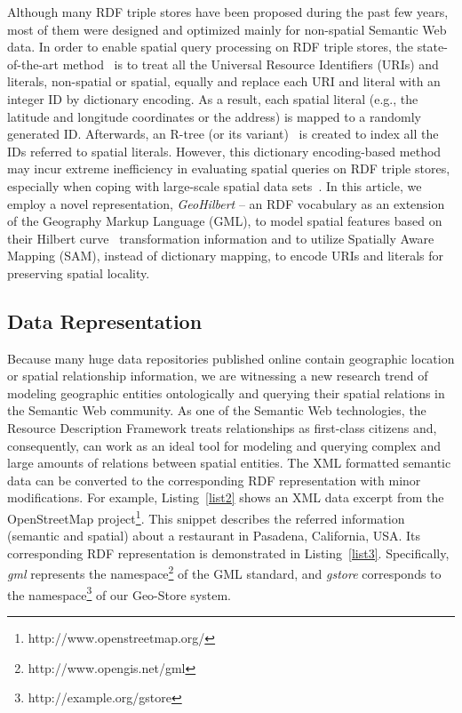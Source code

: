 
Although many RDF triple stores have been proposed during the past
few years, most of them were designed and optimized mainly for
non-spatial Semantic Web data. In order to enable spatial query
processing on RDF triple stores, the state-of-the-art
method~\cite{conf/gis/BrodtNM10} is to treat all the Universal
Resource Identifiers (URIs) and literals, non-spatial or spatial,
equally and replace each URI and literal with an integer ID by
dictionary encoding. As a result, each spatial literal (e.g., the
latitude and longitude coordinates or the address) is mapped to a
randomly generated ID. Afterwards, an R-tree (or its
variant)~\cite{reference/gis/HadjieleftheriouMTT08} is created to
index all the IDs referred to spatial literals. However, this
dictionary encoding-based method may incur extreme inefficiency in
evaluating spatial queries on RDF triple stores, especially when
coping with large-scale spatial data
sets~\cite{conf/gis/BrodtNM10}. In this article, we employ a novel
representation, \emph{GeoHilbert} -- an RDF vocabulary as an
extension of the Geography Markup Language (GML), to model spatial
features based on their Hilbert
curve~\cite{journals/tkde/MoonJFS01} transformation information
and to utilize Spatially Aware Mapping (SAM), instead of
dictionary mapping, to encode URIs and literals for preserving
spatial locality.


\subsection{Data Representation}

Because many huge data repositories published online contain
geographic location or spatial relationship information, we are
witnessing a new research trend of modeling geographic entities
ontologically and querying their spatial relations in the Semantic
Web community. As one of the Semantic Web technologies, the
Resource Description Framework treats relationships as first-class
citizens and, consequently, can work as an ideal tool for modeling
and querying complex and large amounts of relations between
spatial entities. The XML formatted semantic data can be converted
to the corresponding RDF representation with minor modifications.
For example, Listing~\ref{list2} shows an XML data excerpt from
the OpenStreetMap project\footnote{http://www.openstreetmap.org/}.
This snippet describes the referred information (semantic and
spatial) about a restaurant in Pasadena, California, USA. Its
corresponding RDF representation is demonstrated in
Listing~\ref{list3}. Specifically, \emph{gml} represents the
namespace\footnote{http://www.opengis.net/gml} of the GML
standard, and \emph{gstore} corresponds to the
namespace\footnote{http://example.org/gstore} of our Geo-Store
system.

